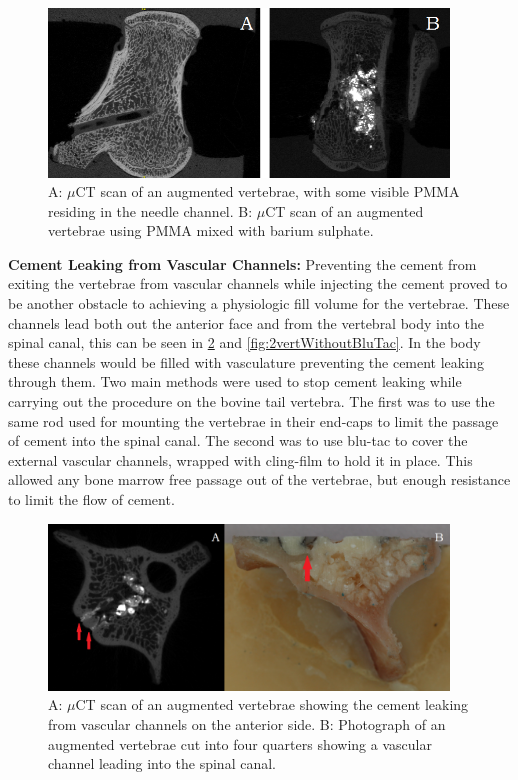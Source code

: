 \begin{figure}[ht!]
\centering
\includegraphics[width=4.18472in]{images/withWithoutBaSo4.png}
\caption{A: $\mu$CT scan of an augmented vertebrae, with some visible PMMA residing in the needle channel. B: $\mu$CT scan of an augmented vertebrae using PMMA mixed with barium sulphate.}
\label{fig:withWithoutBaSO4}
\end{figure}
\textbf{Cement Leaking from Vascular Channels:} Preventing the cement from
exiting the vertebrae from vascular channels while injecting the cement proved
to be another obstacle to achieving a physiologic fill volume for the
vertebrae. These channels lead both out the anterior face and from the
vertebral body into the spinal canal, this can be seen in
\cref{fig:cementleakage} and \ref{fig:2vertWithoutBluTac}. In the body these
channels would be filled with vasculature preventing the cement leaking through
them. Two main methods were used to stop cement leaking while carrying out the
procedure on the bovine tail vertebra. The first was to use the same rod used
for mounting the vertebrae in their end-caps to limit the passage of cement
into the spinal canal. The second was to use blu-tac to cover the external
vascular channels, wrapped with cling-film to hold it in place. This allowed
any bone marrow free passage out of the vertebrae, but enough resistance to
limit the flow of cement.

\begin{figure}[ht!]
\centering
\includegraphics[width=4.18472in]{images/cementleakage.png}
\caption{A: $\mu$CT scan of an augmented vertebrae showing the cement leaking from vascular channels on the anterior side. B: Photograph of an augmented vertebrae cut into four quarters showing a vascular channel leading into the spinal canal.}
\label{fig:cementleakage}
\end{figure}

